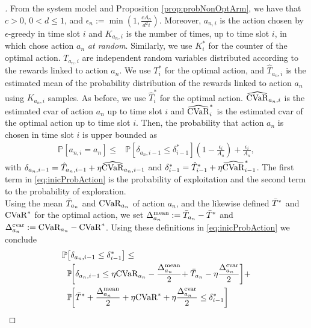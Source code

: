 \begin{proof}[\unskip\nopunct]
From the system model and Proposition \ref{prop:probNonOptArm}, we have that $c > 0$, $0 < d \leq 1$, and 
$\epsilon_n := \min(1, \frac{cA_n}{d^2i})$. 
Moreover, $a_{n,i}$ is the action chosen by $\epsilon$-greedy in time slot $i$ and $K_{a_n, i}$ is the number of times, up to time slot $i$, in which \name{} chose action $a_n$ \textit{at random}. Similarly, we use $K^*_{i}$ for the counter of the optimal action.
$T_{a_n, i}$ are independent random variables distributed according to the rewards linked to action $a_n$. We use $T_i^*$ for the optimal action, and $\hat{T}_{a_n, i}$ is the estimated mean of the probability distribution of the rewards linked to action $a_n$ using $K_{a_n,i}$ samples. As before, we use $\hat{T}^*_{i}$ for the optimal action.
${\widehat{\mathrm{CVaR}}}_{a_n, i}$ is the estimated \gls{cvar} of action $a_n$ up to time slot $i$ and ${\widehat{\mathrm{CVaR}}}_{i}^*$ is the estimated \gls{cvar} of the optimal action up to time slot $i$.
Then, the probability that action $a_n$ is chosen in time slot $i$ is upper bounded as
{\small
 \begin{align}
     \label{eq:inicProbAction}
    \mathbb{P}[a_{n,i} = a_n] \leq & \mathbb{P}\left[\delta_{a_n,i-1} \leq \delta_{i-1}^* \right]\left(1 - \frac{\epsilon_i}{A_n} \right) + \frac{\epsilon_i}{A_n},
\end{align} }
 with $\delta_{a_n,i-1} = \hat{T}_{a_n, i-1} + \eta {\widehat{\mathrm{CVaR}}}_{a_n, i-1}$ and $\delta^*_{i-1} = \hat{T}^*_{i-1} + \eta {\widehat{\mathrm{CVaR}}}_{i-1}^*$.
The first term in \eqref{eq:inicProbAction} is the probability of exploitation and the second term to the probability of exploration. \\ 
Using the mean $\Bar{T}_{a_n}$ and ${\mathrm{CVaR}}_{a_n}$ of action $a_n$, and the likewise defined $\Bar{T}^*$ and ${\mathrm{CVaR}}_{}^*$ for the optimal action, we set $\Delta^\mathrm{mean}_{a_{n}} := \Bar{T}_{a_n} - \Bar{T}^*$ and $\Delta^\mathrm{cvar}_{a_{n}} := {\mathrm{CVaR}}_{a_n} - {\mathrm{CVaR}}_{}^*$.
Using these definitions in \eqref{eq:inicProbAction} we conclude
{\small
\begin{align}
    \mathbb{P} &\left[\delta_{a_n,i-1} \leq \delta_{i-1}^*\right] \leq \nonumber \\
    &\mathbb{P}\!\left[\delta_{a_n,i-1} \leq \eta \cvar{a_n}  - \frac{\Delta^\mathrm{mean}_{a_n}}{2} + \right. \left. \bar{T}_{a_n}  - \eta \frac{\Delta^\mathrm{cvar}_{a_n}}{2}\right] +\nonumber \\
    &\mathbb{P}\!\left[\bar{T}^* + \frac{\Delta^\mathrm{mean}_{a_n}}{2} + \eta \cvar{}^* +  \eta \frac{\Delta^\mathrm{cvar}_{a_n}}{2} \leq \delta_{i-1}^*\right] \nonumber \\

\end{align}}
\end{proof}
